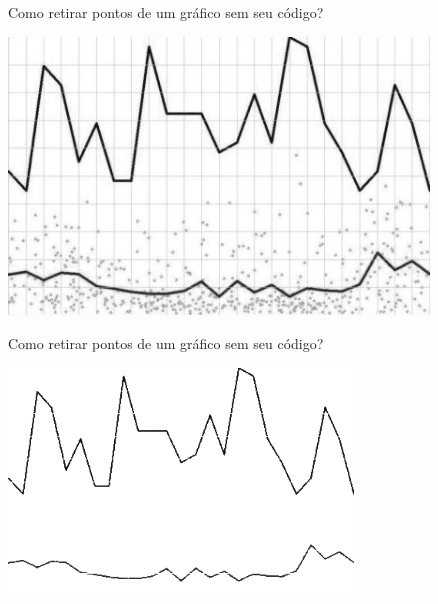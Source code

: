 \documentclass[
  ignorenonframetext,
]{beamer}
\newenvironment{Shaded}{\begin{snugshade}}{\end{snugshade}}
\newcommand{\DataTypeTok}[1]{\textcolor[rgb]{0.13,0.29,0.53}{#1}}
\newcommand{\KeywordTok}[1]{\textcolor[rgb]{0.13,0.29,0.53}{\textbf{#1}}}
\newcommand{\NormalTok}[1]{#1}
\newcommand{\OperatorTok}[1]{\textcolor[rgb]{0.81,0.36,0.00}{\textbf{#1}}}
\newcommand{\StringTok}[1]{\textcolor[rgb]{0.31,0.60,0.02}{#1}}
\begin{document}
\begin{frame}{Como retirar pontos de um gráfico sem seu código?}
\protect\hypertarget{como-retirar-pontos-de-um-gruxe1fico-sem-seu-cuxf3digo-2}{}

\includegraphics[width=4.4in]{IMAGENS/grafico_ponto1}

\begin{center}
\tiny{}
\end{center}

\end{frame}

\begin{frame}[fragile]{Como retirar pontos de um gráfico sem seu
código?}
\protect\hypertarget{como-retirar-pontos-de-um-gruxe1fico-sem-seu-cuxf3digo-3}{}

\small

\begin{Shaded}
\end{Shaded}

\includegraphics[width=3.6in]{IMAGENS/grafico_ponto2}

\begin{center}
\tiny{}
\end{center}

\end{frame}
\end{document}
